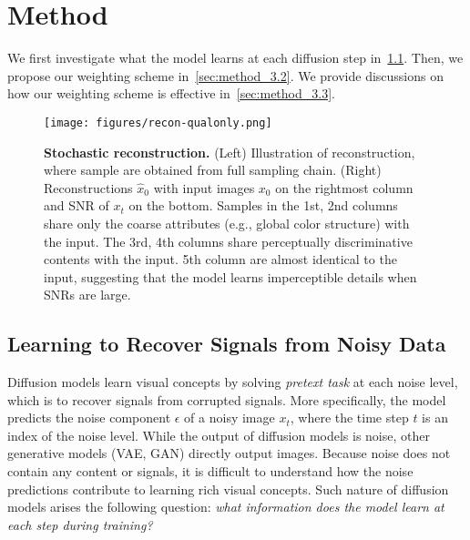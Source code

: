\section{Method}
\label{sec:method}
We first investigate what the model learns at each diffusion step in~\cref{sec:method_3.1}. Then, we propose our weighting scheme in~\cref{sec:method_3.2}. We provide discussions on how our weighting scheme is effective in~\cref{sec:method_3.3}.

\begin{figure*}[t!]
  \centering
  \texttt{[image: figures/recon-qualonly.png]}
  \caption{\textbf{Stochastic reconstruction.} (Left) Illustration of reconstruction, where sample are obtained from full sampling chain. %
  (Right) Reconstructions $\hat{x}_0$ with input images $x_0$ on the rightmost column and SNR of $x_t$ on the bottom. Samples in the 1st, 2nd columns share only the coarse attributes (e.g., global color structure) with the input. The 3rd, 4th columns share perceptually discriminative contents with the input. 5th column are almost identical to the input, suggesting that the model learns imperceptible details when SNRs are large.}
  \label{fig:recon}
\end{figure*}

\subsection{Learning to Recover Signals from Noisy Data}
\label{sec:method_3.1}
Diffusion models learn visual concepts by solving \textit{pretext task} at each noise level, which is to recover signals from corrupted signals.
More specifically, the model predicts the noise component $\epsilon$ of a noisy image $x_t$, where the time step $t$ is an index of the noise level. While the output of diffusion models is noise, other generative models (VAE, GAN) directly output images. Because noise does not contain any content or signals, it is difficult to understand how the noise predictions contribute to learning rich visual concepts. Such nature of diffusion models arises the following question: \textit{what information does the model learn at each step during training?} 

